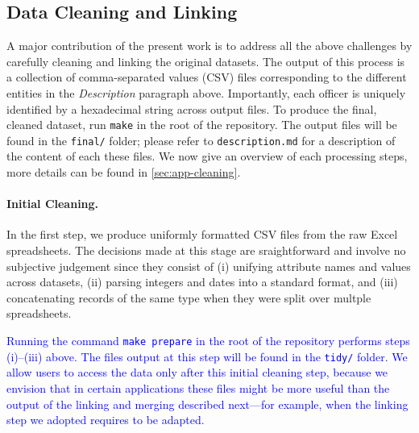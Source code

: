 \subsection{Data Cleaning and Linking}\label{sec:cleaning}

A major contribution of the present work is to address all the above challenges
by carefully cleaning and linking the original datasets. The output of this
process is a collection of comma-separated values (CSV) files corresponding to
the different entities in the \emph{Description} paragraph above.  Importantly,
each officer is uniquely identified by a hexadecimal string across output
files. To produce the final, cleaned dataset, run \texttt{make} in the root of
the repository. The output files will be found in the \texttt{final/} folder;
please refer to \texttt{description.md} for a description of the content of
each these files. We now give an overview of each processing steps, more
details can be found in \cref{sec:app-cleaning}.

\paragraph{Initial Cleaning.} In the first step, we produce uniformly formatted
CSV files from the raw Excel spreadsheets. The decisions made at this stage are
sraightforward and involve no subjective judgement since they consist of (i)
unifying attribute names and values across datasets, (ii) parsing integers and
dates into a standard format, and (iii) concatenating records of the same type
when they were split over multple spreadsheets.


\textcolor{blue}{Running the command \texttt{make prepare} in the root of the repository performs steps (i)--(iii) above. The files output at this step will be found in the \texttt{tidy/} folder. We allow users to access the data only 
after this initial cleaning step, because we envision that in certain applications these
files might be more useful than the output of the linking and merging described next—for example, when the linking step we adopted requires to be adapted.}


